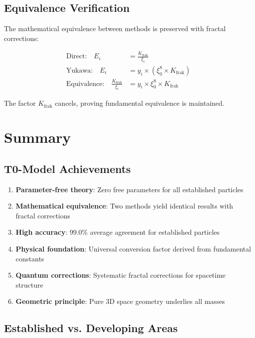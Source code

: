 \documentclass[12pt,a4paper]{article}
\begin{document}
	\subsection{Equivalence Verification}
	\label{subsec:equivalence_verification}
	
	The mathematical equivalence between methods is preserved with fractal corrections:
	
	\begin{align}
		\text{Direct:} \quad E_i &= \frac{K_{\text{frak}}}{\xi_i} \\
		\text{Yukawa:} \quad E_i &= y_i \times (\xi_0^8 \times K_{\text{frak}}) \\
		\text{Equivalence:} \quad \frac{K_{\text{frak}}}{\xi_i} &= y_i \times \xi_0^8 \times K_{\text{frak}}
	\end{align}
	
	The factor $K_{\text{frak}}$ cancels, proving fundamental equivalence is maintained.
	
	\section{Summary}
	\label{sec:summary}
	
	\subsection{T0-Model Achievements}
	\label{subsec:achievements}
	
	\begin{enumerate}
		\item \textbf{Parameter-free theory}: Zero free parameters for all established particles
		\item \textbf{Mathematical equivalence}: Two methods yield identical results with fractal corrections
		\item \textbf{High accuracy}: 99.0\% average agreement for established particles
		\item \textbf{Physical foundation}: Universal conversion factor derived from fundamental constants
		\item \textbf{Quantum corrections}: Systematic fractal corrections for spacetime structure
		\item \textbf{Geometric principle}: Pure 3D space geometry underlies all masses
	\end{enumerate}
	
	\subsection{Established vs. Developing Areas}
	\label{subsec:established_vs_developing}
	
\end{document}
